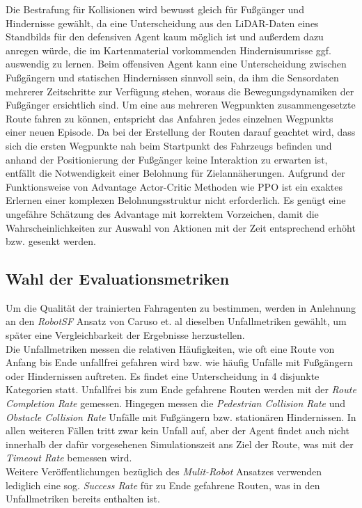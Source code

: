 Die Bestrafung für Kollisionen wird bewusst gleich für Fußgänger und Hindernisse gewählt,
da eine Unterscheidung aus den LiDAR-Daten eines Standbilds für den defensiven Agent kaum
möglich ist und außerdem dazu anregen würde, die im Kartenmaterial vorkommenden Hindernisumrisse
ggf. auswendig zu lernen. Beim offensiven Agent kann eine Unterscheidung zwischen Fußgängern
und statischen Hindernissen sinnvoll sein, da ihm die Sensordaten mehrerer Zeitschritte
zur Verfügung stehen, woraus die Bewegungsdynamiken der Fußgänger ersichtlich sind.
Um eine aus mehreren Wegpunkten zusammengesetzte Route fahren
zu können, entspricht das Anfahren jedes einzelnen Wegpunkts einer neuen Episode. Da bei
der Erstellung der Routen darauf geachtet wird, dass sich die ersten Wegpunkte nah beim
Startpunkt des Fahrzeugs befinden und anhand der Positionierung der Fußgänger keine
Interaktion zu erwarten ist, entfällt die Notwendigkeit einer Belohnung für Zielannäherungen.
Aufgrund der Funktionsweise von Advantage Actor-Critic Methoden wie PPO ist ein exaktes Erlernen
einer komplexen Belohnungsstruktur nicht erforderlich. Es genügt eine ungefähre Schätzung
des Advantage mit korrektem Vorzeichen, damit die Wahrscheinlichkeiten zur Auswahl von
Aktionen mit der Zeit entsprechend erhöht bzw. gesenkt werden.

\subsection{Wahl der Evaluationsmetriken} \label{sec:EvalMetrics}
Um die Qualität der trainierten Fahragenten zu bestimmen, werden in Anlehnung an den
\emph{RobotSF} Ansatz von Caruso et. al \cite{machines11020268} dieselben Unfallmetriken
gewählt, um später eine Vergleichbarkeit der Ergebnisse herzustellen.\\

Die Unfallmetriken messen die relativen Häufigkeiten, wie oft eine Route von Anfang bis
Ende unfallfrei gefahren wird bzw. wie häufig Unfälle mit Fußgängern oder Hindernissen
auftreten. Es findet eine Unterscheidung in 4 disjunkte Kategorien statt.
Unfallfrei bis zum Ende gefahrene Routen werden mit der \emph{Route Completion Rate}
gemessen. Hingegen messen die \emph{Pedestrian Collision Rate} und \emph{Obstacle
Collision Rate} Unfälle mit Fußgängern bzw. stationären Hindernissen. In allen weiteren
Fällen tritt zwar kein Unfall auf, aber der Agent findet auch nicht innerhalb der dafür
vorgesehenen Simulationszeit ans Ziel der Route, was mit der \emph{Timeout Rate}
bemessen wird.\\

Weitere Veröffentlichungen bezüglich des \emph{Mulit-Robot} Ansatzes verwenden
lediglich eine sog. \emph{Success Rate} für zu Ende gefahrene Routen, was in den
Unfallmetriken bereits enthalten ist.
